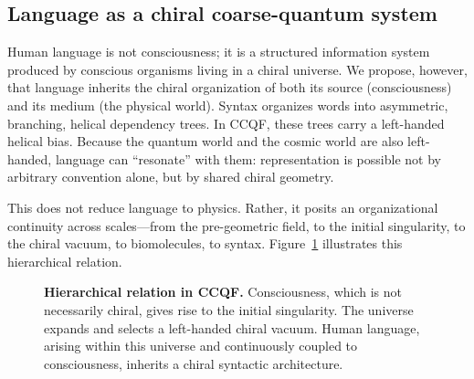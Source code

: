 \documentclass[twocolumn,11pt,a4paper]{article}
\begin{document}
\subsection{Language as a chiral coarse-quantum system}

Human language is not consciousness; it is a structured information system produced by conscious organisms living in a chiral universe. We propose, however, that language inherits the chiral organization of both its source (consciousness) and its medium (the physical world). Syntax organizes words into asymmetric, branching, helical dependency trees. In CCQF, these trees carry a left-handed helical bias. Because the quantum world and the cosmic world are also left-handed, language can ``resonate'' with them: representation is possible not by arbitrary convention alone, but by shared chiral geometry.

This does not reduce language to physics. Rather, it posits an organizational continuity across scales---from the pre-geometric field, to the initial singularity, to the chiral vacuum, to biomolecules, to syntax. Figure~\ref{fig:concept} illustrates this hierarchical relation.

\begin{figure}[t]
\centering
{}
\caption{\textbf{Hierarchical relation in CCQF.} Consciousness, which is not necessarily chiral, gives rise to the initial singularity. The universe expands and selects a left-handed chiral vacuum. Human language, arising within this universe and continuously coupled to consciousness, inherits a chiral syntactic architecture.}
\label{fig:concept}
\end{figure}
\end{document}
